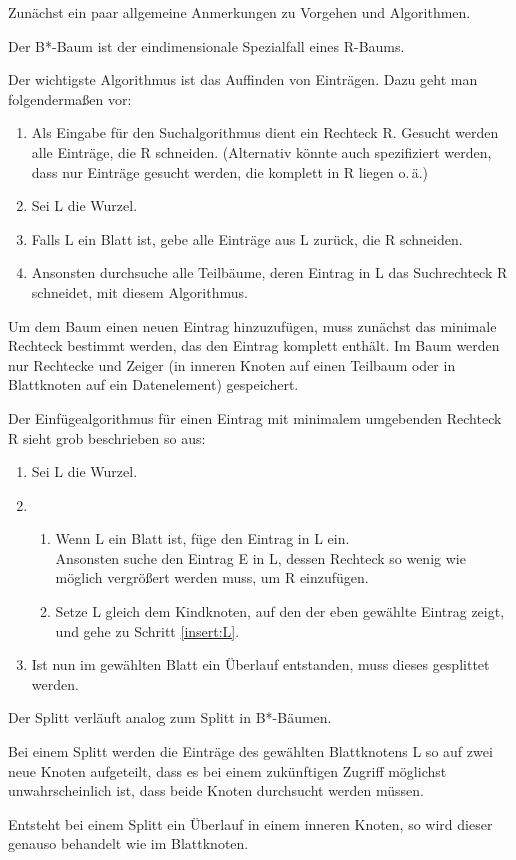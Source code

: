 \begin{solution}
	Zunächst ein paar allgemeine Anmerkungen zu Vorgehen und Algorithmen.

	Der B*-Baum ist der eindimensionale Spezialfall eines R-Baums.

	Der wichtigste Algorithmus ist das Auffinden von Einträgen.
	Dazu geht man folgendermaßen vor:
	\begin{enumerate}
		\item Als Eingabe für den Suchalgorithmus dient ein Rechteck R.
		Gesucht werden alle Einträge, die R schneiden.
		(Alternativ könnte auch spezifiziert werden, dass nur Einträge gesucht werden, die komplett in R liegen o.\,ä.)
		\item Sei L die Wurzel.
		\item Falls L ein Blatt ist, gebe alle Einträge aus L zurück, die R schneiden.
		\item Ansonsten durchsuche alle Teilbäume, deren Eintrag in L das Suchrechteck R schneidet, mit diesem Algorithmus.
	\end{enumerate}

	Um dem Baum einen neuen Eintrag hinzuzufügen, muss zunächst das minimale Rechteck bestimmt werden, das den Eintrag komplett enthält.
	Im Baum werden nur Rechtecke und Zeiger (in inneren Knoten auf einen Teilbaum oder in Blattknoten auf ein Datenelement) gespeichert.

	Der Einfügealgorithmus für einen Eintrag mit minimalem umgebenden Rechteck R sieht grob beschrieben so aus:
	\begin{enumerate}
		\item Sei L die Wurzel.
		\item 
		\begin{enumerate}
			\item \label{insert:L}Wenn L ein Blatt ist, füge den Eintrag in L ein. \\
			Ansonsten suche den Eintrag E in L, dessen Rechteck so wenig wie möglich vergrößert werden muss, um R einzufügen.
			\item Setze L gleich dem Kindknoten, auf den der eben gewählte Eintrag zeigt, und gehe zu Schritt \ref{insert:L}.
		\end{enumerate}
		\item Ist nun im gewählten Blatt ein Überlauf entstanden, muss dieses gesplittet werden.
	\end{enumerate}

	Der Splitt verläuft analog zum Splitt in B*-Bäumen.

	Bei einem Splitt werden die Einträge des gewählten Blattknotens L so auf
	zwei neue Knoten aufgeteilt, dass es bei einem zukünftigen Zugriff möglichst
	unwahrscheinlich ist, dass beide Knoten durchsucht werden müssen.

	Entsteht bei einem Splitt ein Überlauf in einem inneren Knoten, so wird dieser genauso behandelt wie im Blattknoten.
\end{solution}



